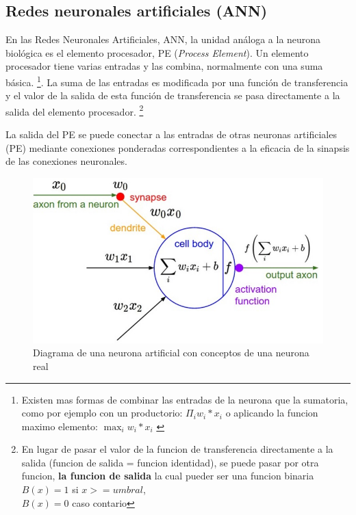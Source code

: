 \documentclass[runningheads]{llncs} %
\begin{document}
\subsection{Redes neuronales artificiales (ANN)}
En las Redes Neuronales Artificiales, ANN, la unidad análoga a la neurona biológica es
el elemento procesador, PE (\textit{Process Element}). Un elemento procesador tiene varias
entradas y las combina, normalmente con una suma básica. 
\footnote[1]{Existen mas formas de combinar las entradas de la neurona 
que la sumatoria, como por ejemplo con un productorio: \(\Pi_{i}{w_{i}*x_{i}}\)
o aplicando la funcion maximo elemento: \(\max_{i}{w_{i}*x_{i}}\) \cite{tesis-matich}}.
La suma de las entradas es
modificada por una función de transferencia y el valor de la salida de esta función de
transferencia se pasa directamente a la salida del elemento procesador.
\footnote[2]{En lugar de pasar el valor de la funcion de transferencia
directamente a la salida (funcion de salida = funcion identidad), 
se puede pasar por otra funcion, \textbf{la funcion de salida} 
la cual pueder ser una funcion binaria \cite{tesis-matich} \\
\(B(x)=1\) si \(x>=umbral\), \\
\(B(x)=0\) caso contario}

La salida del PE se puede conectar a las entradas de otras neuronas artificiales (PE)
mediante conexiones ponderadas correspondientes a la eficacia de la sinapsis de las
conexiones neuronales. \cite{libro-def}

\begin{figure}
    \centering
    \includegraphics[scale=0.7]{neurona_artificial2.png}
    \caption{Diagrama de una neurona artificial con conceptos de una neurona real \cite{img-neurona_artificial2}}
    \label{fig:neurona_artificial}
\end{figure}
\end{document}
